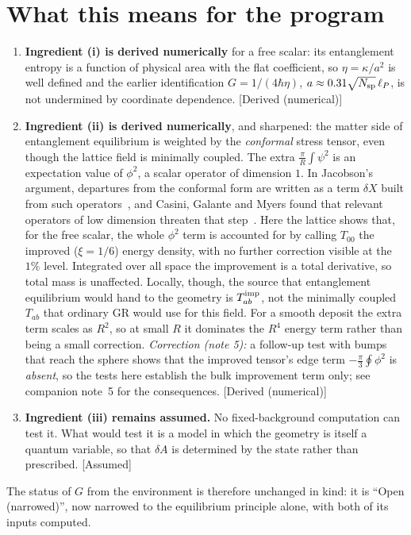 \documentclass[11pt]{article}
\newcommand{\st}[1]{\textsf{\small[#1]}}
\begin{document}
\section{What this means for the program}
\begin{enumerate}
\item \textbf{Ingredient (i) is derived numerically} for a free scalar: its entanglement entropy is a function of physical area with the flat coefficient, so $\eta=\kappa/a^2$ is well defined and the earlier identification $G=1/(4\hbar\eta)$, $a\approx0.31\sqrt{N_{\rm sp}}\,\ell_P$, is not undermined by coordinate dependence. \st{Derived (numerical)}
\item \textbf{Ingredient (ii) is derived numerically}, and sharpened: the matter side of entanglement equilibrium is weighted by the \emph{conformal} stress tensor, even though the lattice field is minimally coupled. The extra $\tfrac{\pi}{R}\int\psi^2$ is an expectation value of $\phi^2$, a scalar operator of dimension $1$. In Jacobson's argument, departures from the conformal form are written as a term $\delta X$ built from such operators~\cite{Jacobson2016}, and Casini, Galante and Myers found that relevant operators of low dimension threaten that step~\cite{CasiniGalanteMyers2016}. Here the lattice shows that, for the free scalar, the whole $\phi^2$ term is accounted for by calling $T_{00}$ the improved ($\xi=1/6$) energy density, with no further correction visible at the $1\%$ level. Integrated over all space the improvement is a total derivative, so total mass is unaffected. Locally, though, the source that entanglement equilibrium would hand to the geometry is $T^{\rm imp}_{ab}$, not the minimally coupled $T_{ab}$ that ordinary GR would use for this field. For a smooth deposit the extra term scales as $R^2$, so at small $R$ it dominates the $R^4$ energy term rather than being a small correction. \emph{Correction (note 5):} a follow-up test with bumps that reach the sphere shows that the improved tensor's edge term $-\tfrac{\pi}{3}\oint\phi^2$ is \emph{absent}, so the tests here establish the bulk improvement term only; see companion note~5 for the consequences. \st{Derived (numerical)}
\item \textbf{Ingredient (iii) remains assumed.} No fixed-background computation can test it. What would test it is a model in which the geometry is itself a quantum variable, so that $\delta A$ is determined by the state rather than prescribed. \st{Assumed}
\end{enumerate}
The status of $G$ from the environment is therefore unchanged in kind: it is ``Open (narrowed)'', now narrowed to the equilibrium principle alone, with both of its inputs computed.
\end{document}
